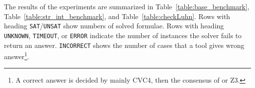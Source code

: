 The results of the experiments are summarized in Table~\ref{table:base_benchmark}, Table~\ref{table:str_int_benchmark}, and Table~\ref{table:checkLuhn}. Rows with heading \texttt{SAT}/\texttt{UNSAT} show numbers of solved formulae. Rows with heading \texttt{UNKNOWN}, \texttt{TIMEOUT}, or \texttt{ERROR} indicate the number of instances the solver fails to return an answer. \texttt{INCORRECT} shows the number of cases that a tool gives wrong answer\footnote{A correct answer is decided by mainly CVC4, then the consensus of {\tool} or Z3.}.

\begin{table}[h]
\centering
\caption{Results of {\tool}, CVC4, Z3, and Z3-str3 on String-Number Conversion benchmark.}
\label{table:str_int_benchmark}
\end{table}


